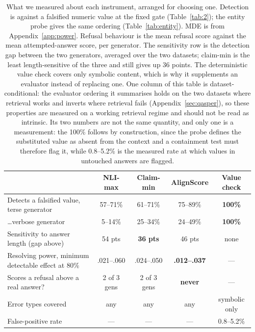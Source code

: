 \documentclass[11pt]{article}
\begin{document}
\begin{table}[t]
\centering\small
\begin{tabular}{lcccc}
\toprule
 & \textbf{NLI-max} & \textbf{Claim-min} & \textbf{AlignScore} & \textbf{Value check} \\
\midrule
Detects a falsified value, terse generator & 57--71\% & 61--71\% & 75--89\% & \textbf{100\%} \\
\quad \dots verbose generator & 5--14\% & 25--34\% & 24--49\% & \textbf{100\%} \\
Sensitivity to answer length (gap above) & 54 pts & \textbf{36 pts} & 46 pts & none \\
Resolving power, minimum detectable effect at 80\% & .021--.060 & .024--.050 & \textbf{.012--.037} & --- \\
Scores a refusal above a real answer? & 2 of 3 gens & 2 of 3 gens & \textbf{never} & --- \\
Error types covered & any & any & any & symbolic only \\
False-positive rate & --- & --- & --- & 0.8--5.2\% \\
\bottomrule
\end{tabular}
\caption{What we measured about each instrument, arranged for choosing one. Detection is against a falsified numeric value at the fixed gate (Table~\ref{tab:2}); the entity probe gives the same ordering (Table~\ref{tab:entity}). MDE is from Appendix~\ref{app:power}. Refusal behaviour is the mean refusal score against the mean attempted-answer score, per generator. The sensitivity row is the detection gap between the two generators, averaged over the two datasets; claim-min is the least length-sensitive of the three and still gives up 36 points. The deterministic value check covers only symbolic content, which is why it supplements an evaluator instead of replacing one. One column of this table is dataset-conditional: the evaluator ordering it summarises holds on the two datasets where retrieval works and inverts where retrieval fails (Appendix~\ref{sec:qasper}), so these properties are measured on a working retrieval regime and should not be read as intrinsic. Its two numbers are not the same quantity, and only one is a measurement: the 100\% follows by construction, since the probe defines the substituted value as absent from the context and a containment test must therefore flag it, while 0.8--5.2\% is the measured rate at which values in untouched answers are flagged.}
\label{tab:choose}
\end{table}
\end{document}
